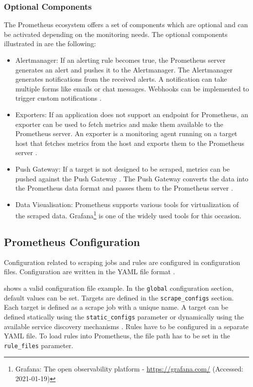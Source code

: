 \subsubsection{Optional Components}
The Prometheus ecosystem offers a set of components which are optional and can be activated depending on the monitoring needs.
The optional components illustrated in  are the following:

\begin{itemize}
\item Alertmanager:
If an alerting rule becomes true, the Prometheus server generates an alert and pushes it to the Alertmanager. The Alertmanager generates notifications from the received alerts. A notification can take multiple forms like emails or chat messages. Webhooks can be implemented to trigger custom notifications \cite{Bastos2019Prom}.

\item Exporters:
If an application does not support an endpoint for Prometheus, an exporter can be used to fetch metrics and make them available to the Prometheus server. An exporter is a monitoring agent running on a target host that fetches metrics from the host and exports them to the Prometheus server \cite{Pandey2020Monitoring}.

\item Push Gateway:
If a target is not designed to be scraped, metrics can be pushed against the Push Gateway \cite{Prom2020Docs}. The Push Gateway converts the data into the Prometheus data format and passes them to the Prometheus server \cite{Pandey2020Monitoring}.

\item Data Visualisation:
Prometheus supports various tools for virtualization of the scraped data. Grafana\footnote{Grafana: The open observability platform - \url{https://grafana.com/} (Accessed: 2021-01-19)} is one of the widely used tools for this occasion.
\end{itemize}


\subsection{Prometheus Configuration}
\label{sec:04_prom_config}
Configuration related to scraping jobs and rules are configured in configuration files. Configuration are written in the YAML file format \cite{Prom2020Docs}.


 shows a valid configuration file example.
In the \texttt{global} configuration section, default values can be set.
Targets are defined in the \texttt{scrape\_configs} section. Each target is defined as a scrape job with a unique name.  A target can be defined statically using the \texttt{static\_configs} parameter or dynamically using the available service discovery mechanisms \cite{Prom2020Docs}.
Rules have to be configured in a separate YAML file. To load rules into Prometheus, the file path has to be set in the \texttt{rule\_files} parameter.


